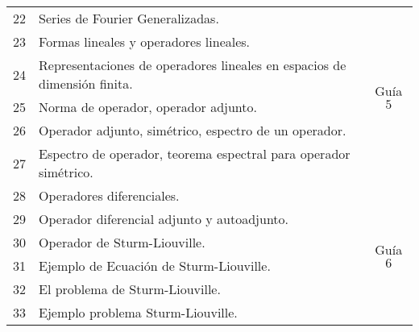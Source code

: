 \begin{table}[H]
\begin{tabular}{||c|p{13cm}||c||}
		\hline
			22 & Series de Fourier Generalizadas. & \multirow{6}{2cm}{Guía $5$} \\
			23 & Formas lineales y operadores lineales. & \\
			24 & Representaciones de operadores lineales en espacios de dimensión finita. & \\
			25 & Norma de operador, operador adjunto. & \\
			26 & Operador adjunto, simétrico, espectro de un operador. & \\
			27 & Espectro de operador, teorema espectral para operador simétrico. & \\
		\hline
			28 & Operadores diferenciales. & \multirow{6}{2cm}{Guía $6$} \\
			29 & Operador diferencial adjunto y autoadjunto. & \\
			30 & Operador de Sturm-Liouville. & \\
			31 & Ejemplo de Ecuación de Sturm-Liouville. & \\
			32 & El problema de Sturm-Liouville. & \\
			33 & Ejemplo problema Sturm-Liouville. & \\
		\hline
		\hline
	\end{tabular}
\end{table}



